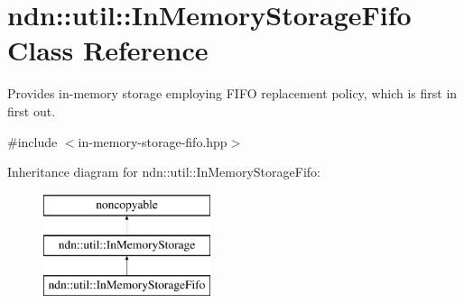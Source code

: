 \hypertarget{classndn_1_1util_1_1InMemoryStorageFifo}{}\section{ndn\+:\+:util\+:\+:In\+Memory\+Storage\+Fifo Class Reference}
\label{classndn_1_1util_1_1InMemoryStorageFifo}


Provides in-\/memory storage employing F\+I\+FO replacement policy, which is first in first out.  




{\ttfamily \#include $<$in-\/memory-\/storage-\/fifo.\+hpp$>$}

Inheritance diagram for ndn\+:\+:util\+:\+:In\+Memory\+Storage\+Fifo\+:\begin{figure}[H]
\begin{center}
\leavevmode
\includegraphics[height=3.000000cm]{classndn_1_1util_1_1InMemoryStorageFifo}
\end{center}
\end{figure}
